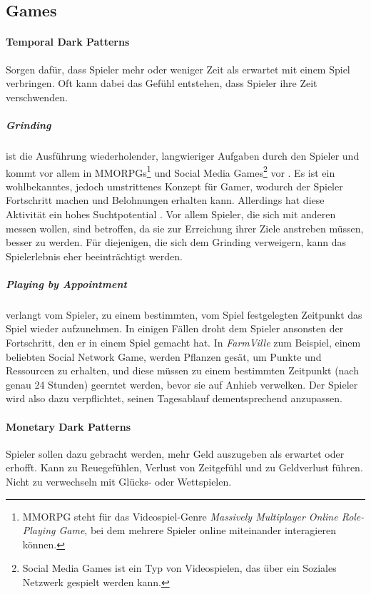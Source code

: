\documentclass[a4paper]{article}
\begin{document}
\subsection{Games}
\label{sub:games}

\paragraph{Temporal Dark Patterns}
Sorgen dafür, dass Spieler mehr oder weniger Zeit als erwartet mit einem Spiel verbringen. Oft kann dabei das Gefühl entstehen, dass Spieler ihre Zeit verschwenden.

\subparagraph{Grinding} ist die Ausführung wiederholender, langwieriger Aufgaben durch den Spieler und kommt vor allem in MMORPGs\footnote{\label{foot:8} MMORPG steht für das Videospiel-Genre \textit{Massively Multiplayer Online Role-Playing Game}, bei dem mehrere Spieler online miteinander interagieren können.} und Social Media Games\footnote{\label{foot:9} Social Media Games ist ein Typ von Videospielen, das über ein Soziales Netzwerk gespielt werden kann.} vor \cite{nakamura}. Es ist ein wohlbekanntes, jedoch umstrittenes Konzept für Gamer, wodurch der Spieler Fortschritt machen und Belohnungen erhalten kann. Allerdings hat diese Aktivität ein hohes Suchtpotential \cite{king}.\newline 
Vor allem Spieler, die sich mit anderen messen wollen, sind betroffen, da sie zur Erreichung ihrer Ziele anstreben müssen, besser zu werden. Für diejenigen, die sich dem Grinding verweigern, kann das Spielerlebnis eher beeinträchtigt werden. 

\subparagraph{Playing by Appointment} verlangt vom Spieler, zu einem bestimmten, vom Spiel festgelegten Zeitpunkt das Spiel wieder aufzunehmen. In einigen Fällen droht dem Spieler ansonsten der Fortschritt, den er in einem Spiel gemacht hat.\newline
In \textit{FarmVille} zum Beispiel, einem beliebten Social Network Game, werden Pflanzen gesät, um Punkte und Ressourcen zu erhalten, und diese müssen zu einem bestimmten Zeitpunkt (nach genau 24 Stunden) geerntet werden, bevor sie auf Anhieb verwelken. Der Spieler wird also dazu verpflichtet, seinen Tagesablauf dementsprechend anzupassen.

\paragraph{Monetary Dark Patterns}
Spieler sollen dazu gebracht werden, mehr Geld auszugeben als erwartet oder erhofft. Kann zu Reuegefühlen, Verlust von Zeitgefühl und zu Geldverlust führen.\newline
Nicht zu verwechseln mit Glücks- oder Wettspielen.
\end{document}
